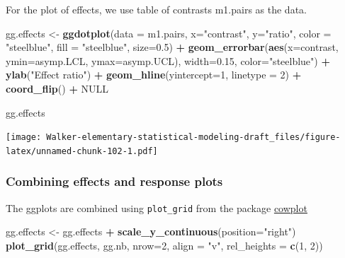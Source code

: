 \documentclass[]{book}
\newenvironment{Shaded}{\begin{snugshade}}{\end{snugshade}}
\newcommand{\DataTypeTok}[1]{\textcolor[rgb]{0.13,0.29,0.53}{#1}}
\newcommand{\DecValTok}[1]{\textcolor[rgb]{0.00,0.00,0.81}{#1}}
\newcommand{\FloatTok}[1]{\textcolor[rgb]{0.00,0.00,0.81}{#1}}
\newcommand{\KeywordTok}[1]{\textcolor[rgb]{0.13,0.29,0.53}{\textbf{#1}}}
\newcommand{\NormalTok}[1]{#1}
\newcommand{\OperatorTok}[1]{\textcolor[rgb]{0.81,0.36,0.00}{\textbf{#1}}}
\newcommand{\OtherTok}[1]{\textcolor[rgb]{0.56,0.35,0.01}{#1}}
\newcommand{\StringTok}[1]{\textcolor[rgb]{0.31,0.60,0.02}{#1}}
\begin{document}
For the plot of effects, we use table of contrasts m1.pairs as the data.

\begin{Shaded}
\begin{Highlighting}[]
\NormalTok{gg.effects <-}\StringTok{ }\KeywordTok{ggdotplot}\NormalTok{(}\DataTypeTok{data =}\NormalTok{ m1.pairs,}
                        \DataTypeTok{x=}\StringTok{"contrast"}\NormalTok{, }
                        \DataTypeTok{y=}\StringTok{"ratio"}\NormalTok{, }
                        \DataTypeTok{color =} \StringTok{"steelblue"}\NormalTok{,}
                        \DataTypeTok{fill =} \StringTok{"steelblue"}\NormalTok{,}
                        \DataTypeTok{size=}\FloatTok{0.5}\NormalTok{) }\OperatorTok{+}
\StringTok{  }
\StringTok{  }\KeywordTok{geom_errorbar}\NormalTok{(}\KeywordTok{aes}\NormalTok{(}\DataTypeTok{x=}\NormalTok{contrast, }
                    \DataTypeTok{ymin=}\NormalTok{asymp.LCL, }
                    \DataTypeTok{ymax=}\NormalTok{asymp.UCL),}
                \DataTypeTok{width=}\FloatTok{0.15}\NormalTok{, }
                \DataTypeTok{color=}\StringTok{"steelblue"}\NormalTok{) }\OperatorTok{+}
\StringTok{  }\KeywordTok{ylab}\NormalTok{(}\StringTok{"Effect ratio"}\NormalTok{) }\OperatorTok{+}
\StringTok{  }\KeywordTok{geom_hline}\NormalTok{(}\DataTypeTok{yintercept=}\DecValTok{1}\NormalTok{, }\DataTypeTok{linetype =} \DecValTok{2}\NormalTok{) }\OperatorTok{+}
\StringTok{  }\KeywordTok{coord_flip}\NormalTok{() }\OperatorTok{+}\StringTok{ }
\StringTok{  }
\StringTok{  }\OtherTok{NULL}

\NormalTok{gg.effects}
\end{Highlighting}
\end{Shaded}

\texttt{[image: Walker-elementary-statistical-modeling-draft\_files/figure-latex/unnamed-chunk-102-1.pdf]}

\hypertarget{combining-effects-and-response-plots}{%
\subsubsection{Combining effects and response plots}\label{combining-effects-and-response-plots}}

The ggplots are combined using \texttt{plot\_grid} from the package \href{https://cran.r-project.org/web/packages/cowplot/vignettes/introduction.html}{cowplot}

\begin{Shaded}
\begin{Highlighting}[]
\NormalTok{gg.effects <-}\StringTok{ }\NormalTok{gg.effects }\OperatorTok{+}\StringTok{ }\KeywordTok{scale_y_continuous}\NormalTok{(}\DataTypeTok{position=}\StringTok{"right"}\NormalTok{)}
\KeywordTok{plot_grid}\NormalTok{(gg.effects, gg.nb, }\DataTypeTok{nrow=}\DecValTok{2}\NormalTok{, }\DataTypeTok{align =} \StringTok{"v"}\NormalTok{, }\DataTypeTok{rel_heights =} \KeywordTok{c}\NormalTok{(}\DecValTok{1}\NormalTok{, }\DecValTok{2}\NormalTok{))}
\end{Highlighting}
\end{Shaded}
\end{document}
